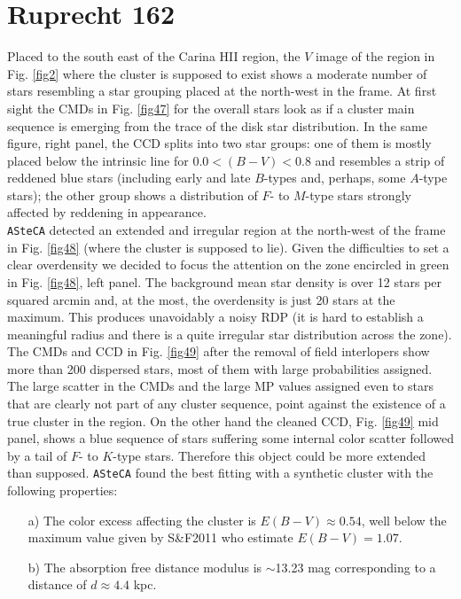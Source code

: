 \documentclass[draft]{aa}
\begin{document}
\section{Ruprecht 162}
\label{app:rup162}

Placed to the south east of the Carina HII region, the $V$ image of the region
in Fig. \ref{fig2} where the cluster is supposed to exist shows a moderate
number of stars resembling a star grouping placed at the north-west in the
frame. At first sight the CMDs in Fig. \ref{fig47} for the overall stars look
as if a cluster main sequence is emerging from the trace of the disk star
distribution.
In the same figure, right panel, the CCD splits into two star groups: one of
them is mostly placed below the intrinsic line for $0.0<(B-V)< 0.8$ and
resembles a strip of reddened blue stars (including early and late $B$-types
and, perhaps, some $A$-type stars); the other group shows a distribution of $F$-
to $M$-type stars strongly affected by reddening in appearance.\\

\texttt{ASteCA} detected an extended and irregular region at the north-west of
the frame in Fig. \ref{fig48} (where the cluster is supposed to lie). Given the
difficulties to set a clear overdensity we decided to focus the attention on the
zone encircled in green in Fig. \ref{fig48}, left panel. The background mean star
density is over 12 stars per squared arcmin and, at the most, the overdensity is
just 20 stars at the maximum. This produces unavoidably a noisy RDP (it is hard
to establish a meaningful radius and there is a quite irregular star
distribution across the zone).
%
The CMDs and CCD in Fig. \ref{fig49} after the removal of field interlopers
show more than 200 dispersed stars, most of them with large probabilities
assigned. The large scatter in the CMDs and the large MP values assigned even
to stars that are clearly not part of any cluster sequence, point against the
existence of a true cluster in the region.
On the other hand the cleaned CCD, Fig. \ref{fig49} mid panel, shows a blue
sequence of stars suffering some internal color scatter followed by a tail of
$F$- to $K$-type stars. Therefore this object could be more extended than
supposed. \texttt{ASteCA} found the best fitting with a synthetic cluster with
the following properties:

\begin{itemize}
\item [a)] The color excess affecting the cluster is $E(B-V)\approx0.54$, well
below the maximum value given by S\&F2011 who estimate $E(B-V)=1.07$.
\item [b)] The absorption free distance modulus is $\sim$13.23 mag
corresponding to a distance of $d\approx4.4$ kpc.
\end{itemize}
\end{document}
